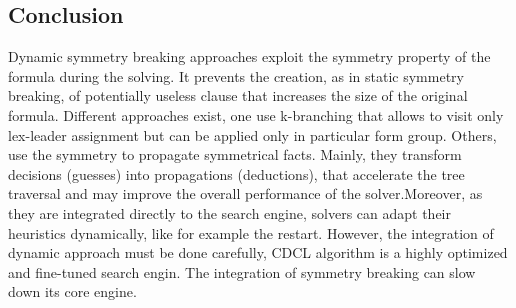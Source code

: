 \subsection{Conclusion} 
Dynamic symmetry breaking approaches exploit the symmetry property of the formula during the solving.
It prevents the creation, as in static symmetry breaking, of potentially useless clause that increases the size of the original formula.
Different approaches exist, one use k-branching that allows to visit only lex-leader assignment but can be applied only in particular form group.
Others, use the symmetry to propagate symmetrical facts.
Mainly, they transform decisions (guesses) into propagations (deductions), that accelerate the tree traversal and may improve the overall
performance of the solver.Moreover, as they are integrated directly to the search engine, solvers can adapt their heuristics dynamically, like for
example the restart.
However, the integration of dynamic approach must be done carefully, CDCL algorithm is a highly optimized and 
fine-tuned search engin. The integration of symmetry breaking can slow down its core engine.

%

